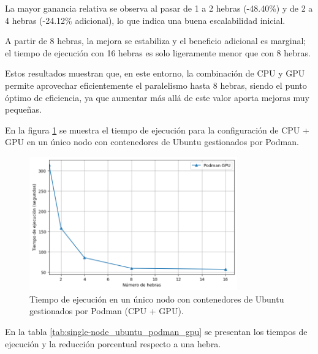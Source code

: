 La mayor ganancia relativa se observa al pasar de 1 a 2 hebras (-48.40\%) y de 2 a 4 hebras (-24.12\% adicional), lo que indica una buena escalabilidad inicial.

A partir de 8 hebras, la mejora se estabiliza y el beneficio adicional es marginal; el tiempo de ejecución con 16 hebras es solo ligeramente menor que con 8 hebras.

Estos resultados muestran que, en este entorno, la combinación de CPU y GPU permite aprovechar eficientemente el paralelismo hasta 8 hebras, siendo el punto óptimo de eficiencia, ya que aumentar más allá de este valor aporta mejoras muy pequeñas.

En la figura \ref{fig:single-node_ubuntu_podman_gpu_time} se muestra el tiempo de ejecución para la configuración de CPU + GPU en un único nodo con contenedores de Ubuntu gestionados por Podman.

\begin{figure}[H]
    \centering
    \includegraphics[width=0.8\textwidth]{imagenes/cap5/single-node_ubuntu_podman_gpu_time.png}
    \caption{Tiempo de ejecución en un único nodo con contenedores de Ubuntu gestionados por Podman (CPU + GPU).}
    \label{fig:single-node_ubuntu_podman_gpu_time}
\end{figure}

En la tabla \ref{tab:single-node_ubuntu_podman_gpu} se presentan los tiempos de ejecución y la reducción porcentual respecto a una hebra.

